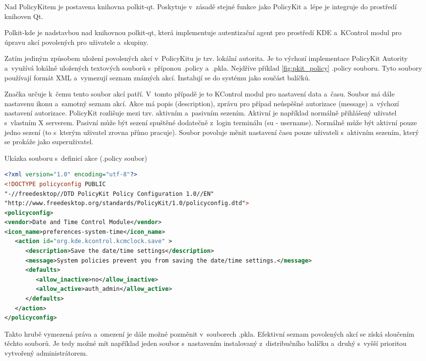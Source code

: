 Nad PolicyKitem je postavena knihovna polkit-qt. Poskytuje v~zásadě stejné funkce jako PolicyKit a~lépe je integruje do prostředí knihoven Qt.

Polkit-kde je nadstavbou nad knihovnou polkit-qt, která implementuje autentizační agent pro prostředí KDE a~KControl modul pro úpravu akcí povolených pro uživatele a~skupiny.

Zatím jediným způsobem uložení povolených akcí v~PolicyKitu je tzv. lokální autorita. Je to výchozí implementace PolicyKit Autority a~využívá lokálně uložených textových souborů s~příponou .policy a~.pkla. Nejdříve příklad \ref{fig:pkit_policy} .policy souboru. Tyto soubory používají formát XML a~vymezují seznam známých akcí. Instalují se do systému jako součást balíčků.

Značka  určuje k~čemu tento soubor akcí patří. V~tomto případě je to KControl modul pro nastavení data a~času. Soubor má dále nastavenu ikonu a~samotný seznam akcí. Akce má popis (description), zprávu pro případ neúspěšné autorizace (message) a~výchozí nastavení autorizace. PolicyKit rozlišuje mezi tzv. aktivním a~pasivním sezením. Aktivní je například normálně přihlášený uživatel s~vlastním X serverem. Pasivní může být sezení spuštěné dodatečně z~login terminálu (su - username). Normálně může být aktivní pouze jedno sezení (to s~kterým uživatel zrovna přímo pracuje). Soubor povoluje měnit nastavení času pouze uživateli s~aktivním sezením, který se prokáže jako superuživatel.

\begin{mylisting}
\caption{Ukázka souboru s~definicí akce (.policy soubor)}
\label{fig:pkit_policy}
\begin{lstlisting}[language=XML]
<?xml version="1.0" encoding="utf-8"?>
<!DOCTYPE policyconfig PUBLIC
"-//freedesktop//DTD PolicyKit Policy Configuration 1.0//EN"
"http://www.freedesktop.org/standards/PolicyKit/1.0/policyconfig.dtd">
<policyconfig>
<vendor>Date and Time Control Module</vendor>
<icon_name>preferences-system-time</icon_name>
   <action id="org.kde.kcontrol.kcmclock.save" >
      <description>Save the date/time settings</description>
      <message>System policies prevent you from saving the date/time settings.</message>
      <defaults>
         <allow_inactive>no</allow_inactive>
         <allow_active>auth_admin</allow_active>
      </defaults>
   </action>
</policyconfig>
\end{lstlisting}
\end{mylisting}

Takto hrubě vymezená práva a~omezení je dále možné pozměnit v~souborech .pkla. Efektivní seznam povolených akcí se získá sloučením těchto souborů. Je tedy možné mít například jeden soubor s~nastavením instalovaný z~distribučního balíčku a~druhý s~vyšší prioritou vytvořený administrátorem.


